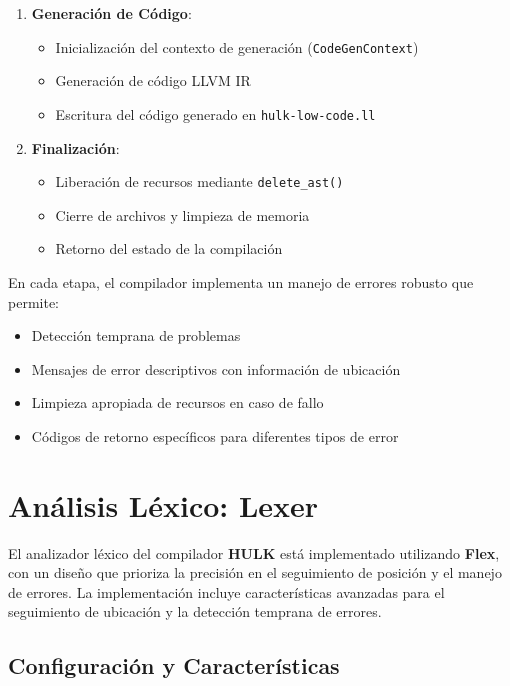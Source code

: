 \documentclass[11pt, a4paper, twoside]{article} %
\begin{document}
\begin{enumerate}
    \item \textbf{Generación de Código}:
    \begin{itemize}
        \item Inicialización del contexto de generación (\texttt{CodeGenContext})
        \item Generación de código LLVM IR
        \item Escritura del código generado en \texttt{hulk-low-code.ll}
    \end{itemize}

    \item \textbf{Finalización}:
    \begin{itemize}
        \item Liberación de recursos mediante \texttt{delete\_ast()}
        \item Cierre de archivos y limpieza de memoria
        \item Retorno del estado de la compilación
    \end{itemize}
\end{enumerate}

En cada etapa, el compilador implementa un manejo de errores robusto que permite:
\begin{itemize}
    \item Detección temprana de problemas
    \item Mensajes de error descriptivos con información de ubicación
    \item Limpieza apropiada de recursos en caso de fallo
    \item Códigos de retorno específicos para diferentes tipos de error
\end{itemize}


\section{An\'alisis L\'exico: Lexer}

El analizador léxico del compilador \textbf{HULK} está implementado utilizando \textbf{Flex}, con un diseño que prioriza la precisión en el seguimiento de posición y el manejo de errores. La implementación incluye características avanzadas para el seguimiento de ubicación y la detección temprana de errores.

\subsection{Configuración y Características}
\end{document}
